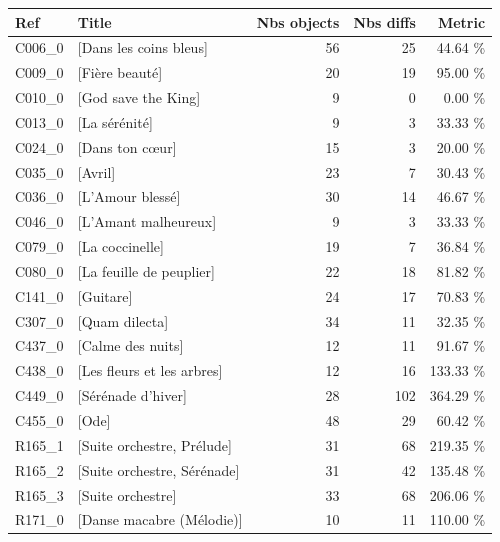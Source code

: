 \begin{small}
\begin{tabular}{l|l|r|r|r}
\textbf{Ref} & \textbf{Title} & \textbf{Nbs objects} &  \textbf{Nbs diffs} & \textbf{Metric} \\ \hline
	C006\_0 & [Dans les coins bleus]  & 56 & 25 & 44.64 \% \\ 
		C009\_0 & [Fière beauté]  & 20 & 19 & 95.00 \% \\ 
		C010\_0 & [God save the King] & 9 & 0 & 0.00 \% \\ 
		C013\_0 & [La sérénité]  & 9 & 3 & 33.33 \% \\ 
		C024\_0 & [Dans ton cœur] & 15 & 3 & 20.00 \% \\ 
		C035\_0 & [Avril] & 23 & 7 & 30.43 \% \\ 
		C036\_0 & [L'Amour blessé] & 30 & 14 & 46.67 \% \\ 
		C046\_0 & [L'Amant malheureux] & 9 & 3 & 33.33 \% \\ 
		C079\_0 & [La coccinelle]  & 19 & 7 & 36.84 \% \\ 
		C080\_0 & [La feuille de peuplier] & 22 & 18 & 81.82 \% \\ 
		C141\_0 & [Guitare]  & 24 & 17 & 70.83 \% \\ 
		C307\_0 & [Quam dilecta] & 34 & 11 & 32.35 \% \\ 
		C437\_0 & [Calme des nuits] & 12 & 11 & 91.67 \% \\ 
		C438\_0 & [Les fleurs et les arbres] & 12 & 16 & 133.33 \% \\ 
		C449\_0 & [Sérénade d'hiver]  & 28 & 102 & 364.29 \% \\ 
		C455\_0 & [Ode]  & 48 & 29 & 60.42 \% \\ 
		R165\_1 & [Suite orchestre, Prélude] & 31 & 68 & 219.35 \% \\ 
		R165\_2 & [Suite orchestre, Sérénade] & 31 & 42 & 135.48 \% \\ 
		R165\_3 & [Suite orchestre] & 33 & 68 & 206.06 \% \\ 
		R171\_0 & [Danse macabre (Mélodie)]  & 10 & 11 & 110.00 \% \\ 
		\hline
\end{tabular}
\end{small}
	